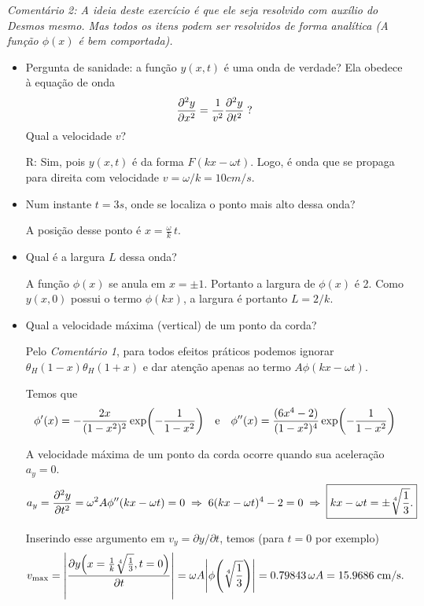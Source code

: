 \documentclass[a4paper,10pt]{article}
\begin{document}
\n

\textit{Comentário 2: A ideia deste exercício é que ele seja resolvido com auxílio do Desmos mesmo. Mas todos os itens podem ser resolvidos de forma analítica (A função $\phi(x)$ é bem comportada).}

\n\n

\begin{itemize}

\item Pergunta de sanidade: a função $y(x,t)$ é uma onda de verdade? Ela obedece à equação de onda
$$
\pdv[2]{y}{x} = \frac{1}{v^2} \pdv[2]{y}{t} \; ?
$$
Qual a velocidade $v$?

R: Sim, pois $y(x,t)$ é da forma $F(kx - \omega t)$. Logo, é onda que se propaga para direita com velocidade $v = \omega/k = 10 \unit{cm/s}$.

\item Num instante $t = 3 \unit{s}$, onde se localiza o ponto mais alto dessa onda?

A posição desse ponto é $x = \frac{\omega}{k} \, t$.

\item Qual é a largura $L$ dessa onda?

A função $\phi(x)$ se anula em $x = \pm 1$. Portanto a largura de $\phi(x)$ é 2. Como $y(x, 0)$ possui o termo $\phi(kx)$, a largura é portanto $L = 2/k$.

\item Qual a velocidade máxima (vertical) de um ponto da corda?

Pelo \textit{Comentário 1}, para todos efeitos práticos podemos ignorar $\theta_H(1-x) \theta_H(1+x)$ e dar atenção apenas ao termo $A \phi(kx - \omega t)$.

Temos que
$$
\phi'(x) = - \frac{2x}{(1-x^2)^2} \exp(-\frac{1}{1-x^2}) \quad \mathrm{e} \quad
\phi''(x) = \frac{(6x^4-2)}{(1-x^2)^4} \exp(-\frac{1}{1-x^2})
$$

A velocidade máxima de um ponto da corda ocorre quando sua aceleração $a_y = 0$.
$$
a_y = \pdv[2]{y}{t} = \omega^2 A \phi''(kx - \omega t) = 0 \; \Rightarrow \;
6 (kx - \omega t)^4 - 2 = 0 \; \Rightarrow \; \boxed{kx - \omega t =  \pm \sqrt[4]{\frac{1}{3}}.}
$$

Inserindo esse argumento em $v_y = \partial y / \partial t$, temos (para $t = 0$ por exemplo)
$$
v_{\text{max}} = \abs{\pdv{y\qty(x = \frac{1}{k} \sqrt[4]{\frac{1}{3}}, t=0)}{t}} = \omega A \abs{ \phi\qty(\sqrt[4]{\frac{1}{3}}) } = 0.79843 \, \omega A = 15.9686 \; \mathrm{cm/s}.
$$

\end{itemize}
\end{document}
